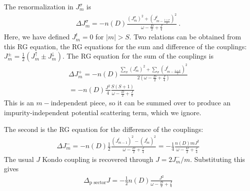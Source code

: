 \documentclass[reprint,prb,superscriptaddress]{revtex4-2}
\begin{document}
The renormalization in \(J^\sigma_m\) is
\begin{equation}\begin{aligned}
	\Delta J^\sigma_{m} = - n(D) \frac{\left( J^\sigma_m \right) ^2 + \left( J^t_{m-\frac{1+\sigma}{2}} \right) ^2}{\omega - \frac{D}{2} + \frac{J}{4}}~.
\end{aligned}\end{equation}
Here, we have defined \(J^t_m = 0\) for \( |m| > S\). Two relations can be obtained from this RG equation, the RG equations for the sum and difference of the couplings: \(J^\pm_m = \frac{1}{2}\left(J^\uparrow_m \pm J^\downarrow_m\right) \). The RG equation for the sum of the couplings is
\begin{equation}\begin{aligned}
	\Delta J^+_m = -n(D)\frac{\sum_\sigma \left( J^\sigma_m \right) ^2 + \sum_\sigma \left( J^t_{m-\frac{1+\sigma}{2}} \right) ^2}{2\left(\omega - \frac{D}{2} + \frac{J}{4}\right)}\\
	= -n(D)\frac{J^2}{4}\frac{S(S+1)}{\omega - \frac{D}{2} + \frac{J}{4}}
\end{aligned}\end{equation}
This is an \(m-\)independent piece, so it can be summed over to produce an impurity-independent potential scattering term, which we ignore. 

The second is the RG equation for the difference of the couplings:
\begin{equation}\begin{aligned}
	\Delta J^-_m = -n(D)\frac{1}{2}\frac{\left( J^t_{m-1} \right) ^2 - \left(J^t_{m}\right) ^2}{\omega - \frac{D}{2} + \frac{J}{4}} = -\frac{1}{4}\frac{n(D) m J^2}{\omega - \frac{D}{2} + \frac{J}{4}}
\end{aligned}\end{equation}
The usual \(J\) Kondo coupling is recovered through \(J = 2J^-_m/m\). Substituting this gives 
\begin{equation}\begin{aligned}
	\Delta_\text{p sector} J = -\frac{1}{2}n(D)\frac{J^2}{\omega - \frac{D}{2} + \frac{J}{4}}
\end{aligned}\end{equation}
\end{document}

